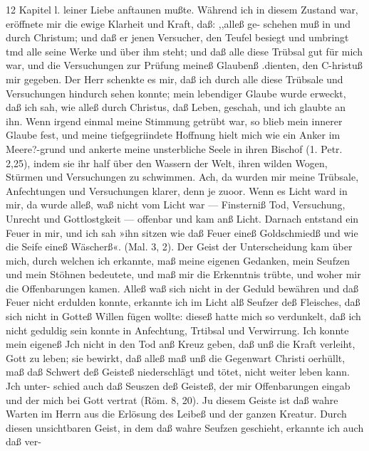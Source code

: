12 Kapitel l.
leiner Liebe anftaunen mußte. Während ich in diesem Zustand
war, eröffnete mir die ewige Klarheit und Kraft, daß: ,,alleß ge-
schehen muß in und durch Christum; und daß er jenen Versucher,
den Teufel besiegt und umbringt tmd alle seine Werke und über
ihm steht; und daß alle diese Trübsal gut für mich war, und
die Versuchungen zur Prüfung meineß Glaubenß .dienten, den
C-hristuß mir gegeben. Der Herr schenkte es mir, daß ich durch
alle diese Trübsale und Versuchungen hindurch sehen konnte;
mein lebendiger Glaube wurde erweckt, daß ich sah, wie alleß
durch Christus, daß Leben, geschah, und ich glaubte an ihn. Wenn
irgend einmal meine Stimmung getrübt war, so blieb mein innerer
Glaube fest, und meine tiefgegriindete Hoffnung hielt mich wie
ein Anker im Meere?-grund und ankerte meine unsterbliche Seele
in ihren Bischof (1. Petr. 2,25), indem sie ihr half über den Wassern
der Welt, ihren wilden Wogen, Stürmen und Versuchungen zu
schwimmen. Ach, da wurden mir meine Trübsale, Anfechtungen
und Versuchungen klarer, denn je zuoor. Wenn es Licht ward
in mir, da wurde alleß, waß nicht vom Licht war — Finsterniß
Tod, Versuchung, Unrecht und Gottlostgkeit — offenbar und kam
anß Licht. Darnach entstand ein Feuer in mir, und ich sah »ihn
sitzen wie daß Feuer eineß Goldschmiedß und wie die Seife eineß
Wäscherß«. (Mal. 3, 2). Der Geist der Unterscheidung kam über
mich, durch welchen ich erkannte, maß meine eigenen Gedanken,
mein Seufzen und mein Stöhnen bedeutete, und maß mir die
Erkenntnis trübte, und woher mir die Offenbarungen kamen.
Alleß waß sich nicht in der Geduld bewähren und daß Feuer
nicht erdulden konnte, erkannte ich im Licht alß Seufzer deß
Fleisches, daß sich nicht in Gotteß Willen fügen wollte: dieseß
hatte mich so verdunkelt, daß ich nicht geduldig sein konnte in
Anfechtung, Trtibsal und Verwirrung. Ich konnte mein eigeneß
Jch nicht in den Tod anß Kreuz geben, daß unß die Kraft
verleiht, Gott zu leben; sie bewirkt, daß alleß maß unß
die Gegenwart Christi oerhüllt, maß daß Schwert deß Geisteß
niederschlägt und tötet, nicht weiter leben kann. Jch unter-
schied auch daß Seuszen deß Geisteß, der mir Offenbarungen
eingab und der mich bei Gott vertrat (Röm. 8, 20). Ju diesem
Geiste ist daß wahre Warten im Herrn aus die Erlösung des
Leibeß und der ganzen Kreatur. Durch diesen unsichtbaren Geist,
in dem daß wahre Seufzen geschieht, erkannte ich auch daß ver-




